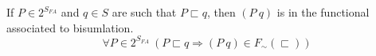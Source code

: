 \begin{comment}
Choose any P and Q such that P is represented by Q on field access. Choose some P' that P transitions too.
Pick some p' in P'. By definition, it is related to a p in P. Use that p. Show how that p is related to p'. Then relate to q'.

Arbitrary P' such that P transitions to P'. Reason over each possible P' (how every many choices might exist--Only one for FA). Pick arbitrary p' in one of the sucessor. Do the forward proof. Show connection in q'. Connect to P' since it holds for arbitrary. 

Repeat process for each possible successor P'

For backward, for each q', there must exists a p'. All we need is one p and then that implies there exists a P. Must do for all Q'. 
\end{comment}

\begin{lemma}
If $P \in 2^{S_\mathit{FA}}$ and $q \in S$ are such that $P \sqsubset q$, then $(P\ q)$ is in the functional associated to bisumlation.
\label{lem:access}
$$
\forall P \in 2^{S_\mathit{FA}}\ (P \sqsubset q \Rightarrow (P\ q) \in F_\sim(\sqsubset))
$$
\end{lemma}

